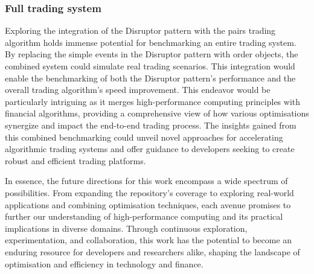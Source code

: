 \documentclass{article}
\theoremstyle{break}
\begin{document}
\subsubsection*{Full trading system}
Exploring the integration of the Disruptor pattern with the pairs trading algorithm holds immense potential for benchmarking an entire trading system. By replacing the simple events in the Disruptor pattern with order objects, the combined system could simulate real trading scenarios. This integration would enable the benchmarking of both the Disruptor pattern's performance and the overall trading algorithm's speed improvement. This endeavor would be particularly intriguing as it merges high-performance computing principles with financial algorithms, providing a comprehensive view of how various optimisations synergize and impact the end-to-end trading process. The insights gained from this combined benchmarking could unveil novel approaches for accelerating algorithmic trading systems and offer guidance to developers seeking to create robust and efficient trading platforms.

In essence, the future directions for this work encompass a wide spectrum of possibilities. From expanding the repository's coverage to exploring real-world applications and combining optimisation techniques, each avenue promises to further our understanding of high-performance computing and its practical implications in diverse domains. Through continuous exploration, experimentation, and collaboration, this work has the potential to become an enduring resource for developers and researchers alike, shaping the landscape of optimisation and efficiency in technology and finance.
\end{document}
